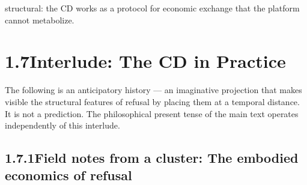 structural: the CD works as a protocol for economic exchange that the platform cannot metabolize.

\section{1.7\quad Interlude: The CD in Practice}

The following is an anticipatory history — an imaginative projection that makes visible the structural features of refusal by placing them at a temporal distance. It is not a prediction. The philosophical present tense of the main text operates independently of this interlude.

\subsection{1.7.1\quad Field notes from a cluster: The embodied economics of refusal}

